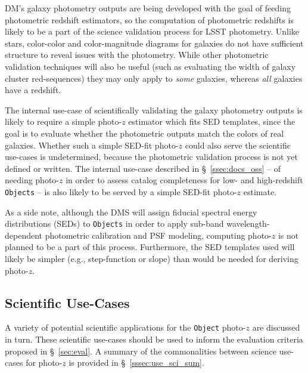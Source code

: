 \documentclass[DM,lsstdraft,toc]{lsstdoc}
\begin{document}
DM's galaxy photometry outputs are being developed with the goal of feeding photometric redshift estimators, so the computation of photometric redshifts is likely to be a part of the science validation process for LSST photometry. 
Unlike stars, color-color and color-magnitude diagrams for galaxies do not have sufficient structure to reveal issues with the photometry.
While other photometric validation techniques will also be useful (such as evaluating the width of galaxy cluster red-sequences) they may only apply to {\it some} galaxies, whereas {\it all} galaxies have a redshift. 

The internal use-case of scientifically validating the galaxy photometry outputs is likely to require a simple photo-$z$ estimator which fits SED templates, since the goal is to evaluate whether the photometric outputs match the colors of real galaxies.
Whether such a simple SED-fit photo-$z$ could also serve the scientific use-cases is undetermined, because the photometric validation process is not yet defined or written.
The internal use-case described in \S~\ref{ssec:docs_oss} -- of needing photo-$z$ in order to assess catalog completeness for low- and high-redshift {\tt Objects} -- is also likely to be served by a simple SED-fit photo-$z$ estimate.

As a side note, although the DMS will assign fiducial spectral energy distributions (SEDs) to {\tt Objects} in order to apply sub-band wavelength-dependent photometric calibration and PSF modeling, computing photo-$z$ is not planned to be a part of this process.
Furthermore, the SED templates used will likely be simpler (e.g., step-function or slope) than would be needed for deriving photo-$z$.

\subsection{Scientific Use-Cases}\label{ssec:use_sci}

A variety of potential scientific applications for the {\tt Object} photo-$z$ are discussed in turn. 
These scientific use-cases should be used to inform the evaluation criteria proposed in \S~\ref{sec:eval}.
A summary of the commonalities between science use-cases for photo-$z$ is provided in \S~\ref{sssec:use_sci_sum}.
\end{document}
